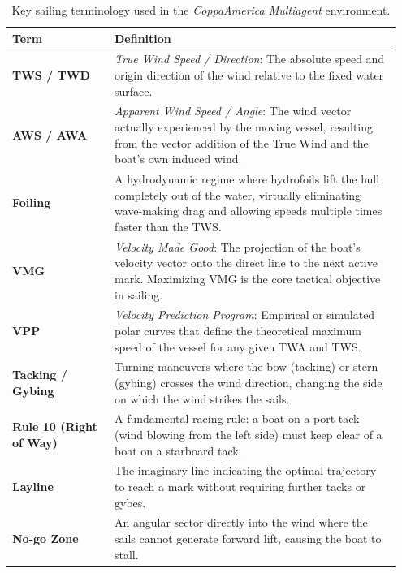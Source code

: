 \documentclass{article}
\begin{document}
\begin{table}[htpb]
    \centering
    \renewcommand{\arraystretch}{1.3}
    \begin{tabular}{|p{0.25\linewidth}|p{0.7\linewidth}|}
        \hline
        \textbf{Term} & \textbf{Definition} \\
        \hline
        \textbf{TWS / TWD} & \textit{True Wind Speed / Direction}: The absolute speed and origin direction of the wind relative to the fixed water surface. \\
        \hline
        \textbf{AWS / AWA} & \textit{Apparent Wind Speed / Angle}: The wind vector actually experienced by the moving vessel, resulting from the vector addition of the True Wind and the boat's own induced wind. \\
        \hline
        \textbf{Foiling} & A hydrodynamic regime where hydrofoils lift the hull completely out of the water, virtually eliminating wave-making drag and allowing speeds multiple times faster than the TWS. \\
        \hline
        \textbf{VMG} & \textit{Velocity Made Good}: The projection of the boat's velocity vector onto the direct line to the next active mark. Maximizing VMG is the core tactical objective in sailing. \\
        \hline
        \textbf{VPP} & \textit{Velocity Prediction Program}: Empirical or simulated polar curves that define the theoretical maximum speed of the vessel for any given TWA and TWS. \\
        \hline
        \textbf{Tacking / Gybing} & Turning maneuvers where the bow (tacking) or stern (gybing) crosses the wind direction, changing the side on which the wind strikes the sails. \\
        \hline
        \textbf{Rule 10 (Right of Way)} & A fundamental racing rule: a boat on a port tack (wind blowing from the left side) must keep clear of a boat on a starboard tack. \\
        \hline
        \textbf{Layline} & The imaginary line indicating the optimal trajectory to reach a mark without requiring further tacks or gybes. \\
        \hline
        \textbf{No-go Zone} & An angular sector directly into the wind where the sails cannot generate forward lift, causing the boat to stall. \\
        \hline
    \end{tabular}
    \caption{Key sailing terminology used in the \textit{CoppaAmerica Multiagent} environment.}
    \label{tab:terminology}
\end{table}
\end{document}
